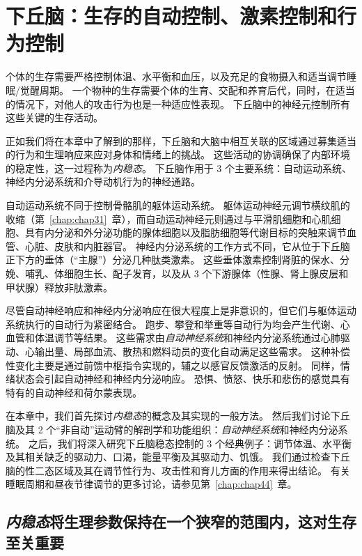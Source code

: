 \chapter{下丘脑：生存的自动控制、激素控制和行为控制} \label{chap:chap41}

个体的生存需要严格控制体温、水平衡和血压，以及充足的食物摄入和适当调节睡眠/觉醒周期。
一个物种的生存需要个体的生育、交配和养育后代，同时，在适当的情况下，对他人的攻击行为也是一种适应性表现。
下丘脑中的神经元控制所有这些关键的生存活动。


正如我们将在本章中了解到的那样，下丘脑和大脑中相互关联的区域通过募集适当的行为和生理响应来应对身体和情绪上的挑战。
这些活动的协调确保了内部环境的稳定性，这一过程称为\textit{内稳态}。
下丘脑作用于 3 个主要系统：自动运动系统、神经内分泌系统和介导动机行为的神经通路。


自动运动系统不同于控制骨骼肌的躯体运动系统。
躯体运动神经元调节横纹肌的收缩（第~\ref{chap:chap31}~章），而自动运动神经元则通过与平滑肌细胞和心肌细胞、具有内分泌和外分泌功能的腺体细胞以及脂肪细胞等代谢目标的突触来调节血管、心脏、皮肤和内脏器官。
神经内分泌系统的工作方式不同，它从位于下丘脑正下方的垂体（“主腺”）分泌几种肽类激素。
这些垂体激素控制肾脏的保水、分娩、哺乳、体细胞生长、配子发育，以及从 3 个下游腺体（性腺、肾上腺皮层和甲状腺）释放非肽激素。


尽管自动神经响应和神经内分泌响应在很大程度上是非意识的，但它们与躯体运动系统执行的自动行为紧密结合。
跑步、攀登和举重等自动行为均会产生代谢、心血管和体温调节等结果。
这些需求由\textit{自动神经系统}和神经内分泌系统通过心肺驱动、心输出量、局部血流、散热和燃料动员的变化自动满足这些需求。
这种补偿性变化主要是通过前馈中枢指令实现的，辅之以感官反馈激活的反射。
同样，情绪状态会引起自动神经和神经内分泌响应。
恐惧、愤怒、快乐和悲伤的感觉具有特有的自动神经和荷尔蒙表现。


在本章中，我们首先探讨\textit{内稳态}的概念及其实现的一般方法。
然后我们讨论下丘脑及其 2 个“非自动”运动臂的解剖学和功能组织：\textit{自动神经系统}和神经内分泌系统。
之后，我们将深入研究下丘脑稳态控制的 3 个经典例子：调节体温、水平衡及其相关缺乏的驱动力、口渴，能量平衡及其驱动力、饥饿。
我们通过检查下丘脑的性二态区域及其在调节性行为、攻击性和育儿方面的作用来得出结论。
有关睡眠周期和昼夜节律调节的更多讨论，请参见第~\ref{chap:chap44}~章。



\section{\textit{内稳态}将生理参数保持在一个狭窄的范围内，这对生存至关重要}

